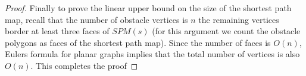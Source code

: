 \begin{proof}
	Finally to prove the linear upper bound on the size of the shortest path
	map, recall that the number of obstacle vertices is $n$ the remaining
	vertices border at least three faces of $SPM(s)$ (for this argument we count
	the obstacle polygons as faces of the shortest path map). Since the number
	of faces is $O(n)$, Eulers formula for planar graphs implies that the total
	number of vertices is also $O(n)$. This completes the proof
\end{proof}
